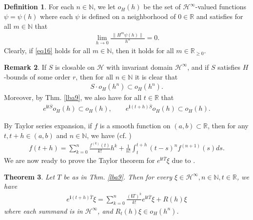 \documentclass[12pt,b5paper,notitlepage]{article}
\theoremstyle{definition}
\newtheorem{df}{Definition}[section]
\newtheorem{rem}[df]{Remark}
\theoremstyle{plain}
\newtheorem{thm}[df]{Theorem}
\newcommand{\mc}{\mathcal}
\newcommand{\ovl}{\overline}
\newcommand{\im}{\mathbf{i}}
\newcommand{\Nbb}{\mathbb N}
\newcommand{\Rbb}{\mathbb R}
\numberwithin{equation}{section}
\begin{document}
\subsection{}

\begin{df}
For each $n\in\Nbb$, we let $o_H(h)$  be the set of $\mc H^\infty$-valued functions $\psi=\psi(h)$ where each $\psi$ is  defined on a neighborhood of $0\in\Rbb$ and satisfies  for all $m\in\Nbb$ that
\begin{align}
	\lim_{h\rightarrow 0}\frac{~\lVert H^m \psi(h)\lVert~}{h^n}=0.\label{eqa16} 
\end{align}
Clearly, if \eqref{eq16} holds for all $m\in\Nbb$, then it holds for all $m\in\Rbb_{\geq0}$.
\end{df}



\begin{rem}\label{lba11}
If $S$ is closable on $\mc H$ with invariant domain $\mc H^\infty$, and if $S$ satisfies $H$-bounds of some order $r$, then for all $n\in\Nbb$ it is clear that
\begin{align*}
S\cdot o_H(h^n)\subset o_H(h^n).	
\end{align*}
Moreover, by Thm. \ref{lba9}, we also have for all $t\in\Rbb$ that
\begin{align*}
e^{\im t\ovl S}o_H(h)\subset o_H(h),\qquad e^{\im (t+h)\ovl S}o_H(h)\subset o_H(h).	
\end{align*}
\end{rem}

By Taylor series expansion, if $f$ is a smooth function on $(a,b)\subset\Rbb$, then for any $t,t+h\in(a,b)$ and $n\in\Nbb$, we have (cf. \cite[Thm. 9.29]{Apo})
\begin{align}
	f(t+h)=\sum_{k=0}^n\frac{f^{(k)}(t)}{k!}h^k+\frac 1{n!}\int_t^{t+h}(t-s)^nf^{(n+1)}(s)ds.	\label{eqa15}
\end{align}
We are now ready to prove the Taylor theorem for $e^{\im t\ovl T}\xi$ due to \cite[Cor. 2.2]{Tol99}.



\begin{thm}\label{lba10}
Let $T$ be as in Thm. \ref{lba9}. Then for every $\xi\in\mc H^\infty,n\in\Nbb,t\in\Rbb$, we have
\begin{align}
e^{\im(t+h)\ovl T}\xi=\sum_{k=0}^n\frac{(\im T)^k}{k!}e^{\im t\ovl T}\xi+R(h)\xi	
\end{align}
where each summand is in $\mc H^\infty$, and  $R_t(h)\xi\in o_H(h^n)$.
\end{thm}
\end{document}
